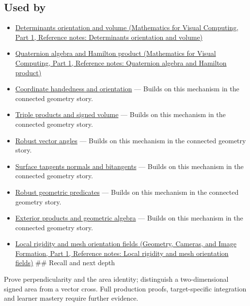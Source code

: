 \subsection{Used by}\label{appendix-2391db8052b1-used-by}

\hypertarget{appendix-2391db8052b1-used-by}{}

\begin{itemize}
\item
  \href{../02-Mathematics-for-Visual-Computing-P01/main.pdf\#nameddest=appendix-da478be01d02}{Determinants orientation and volume (Mathematics for Visual Computing, Part 1, Reference notes: Determinants orientation and volume)}
\item
  \href{../02-Mathematics-for-Visual-Computing-P01/main.pdf\#nameddest=appendix-965d9260eeab}{Quaternion algebra and Hamilton product (Mathematics for Visual Computing, Part 1, Reference notes: Quaternion algebra and Hamilton product)}
\item
  \hyperref[appendix-87d7626c8d37]{Coordinate handedness and orientation} --- Builds on this mechanism in the connected geometry story.
\item
  \hyperref[appendix-5caa058bd9c7]{Triple products and signed volume} --- Builds on this mechanism in the connected geometry story.
\item
  \hyperref[appendix-e569e60e18e6]{Robust vector angles} --- Builds on this mechanism in the connected geometry story.
\item
  \hyperref[appendix-e31893dec985]{Surface tangents normals and bitangents} --- Builds on this mechanism in the connected geometry story.
\item
  \hyperref[appendix-341296fb3f64]{Robust geometric predicates} --- Builds on this mechanism in the connected geometry story.
\item
  \hyperref[appendix-e1960925d1b8]{Exterior products and geometric algebra} --- Builds on this mechanism in the connected geometry story.
\item
  \href{../03-Geometry-Cameras-and-Image-Formation-P01/main.pdf\#nameddest=appendix-7107009c505b}{Local rigidity and mesh orientation fields (Geometry, Cameras, and Image Formation, Part 1, Reference notes: Local rigidity and mesh orientation fields)} \#\# Recall and next depth
\end{itemize}

Prove perpendicularity and the area identity; distinguish a two-dimensional signed area from a vector cross. Full production proofs, target-specific integration and learner mastery require further evidence.

